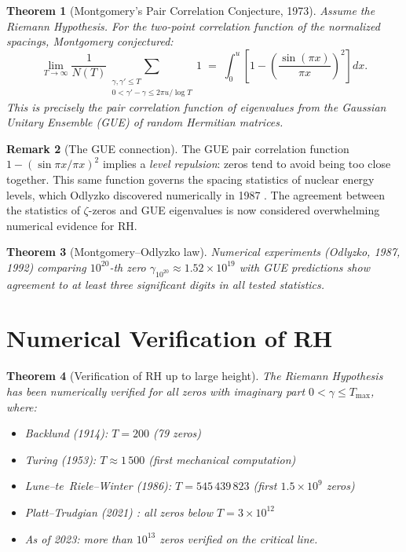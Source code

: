 \documentclass[12pt,a4paper]{amsart}
\newtheorem{theorem}{Theorem}[section]
\theoremstyle{definition}
\newtheorem{remark}[theorem]{Remark}
\begin{document}
\begin{theorem}[Montgomery's Pair Correlation Conjecture, 1973]
\label{thm:montgomery}
Assume the Riemann Hypothesis.  For the two-point correlation function
of the normalized spacings, Montgomery \cite{Montgomery1973} conjectured:
\[
  \lim_{T \to \infty} \frac{1}{N(T)} \sum_{\substack{\gamma, \gamma' \le T \\ 0 < \gamma'-\gamma \le 2\pi u / \log T}}
  1
  \;=\;
  \int_0^u \left[1 - \left(\frac{\sin(\pi x)}{\pi x}\right)^2\right] dx.
\]
This is precisely the pair correlation function of eigenvalues from the
\emph{Gaussian Unitary Ensemble} (GUE) of random Hermitian matrices.
\end{theorem}

\begin{remark}[The GUE connection]
The GUE pair correlation function $1 - (\sin\pi x / \pi x)^2$ implies
a \emph{level repulsion}: zeros tend to avoid being too close together.
This same function governs the spacing statistics of nuclear energy
levels, which Odlyzko discovered numerically in 1987 \cite{Odlyzko1987}.
The agreement between the statistics of $\zeta$-zeros and GUE eigenvalues
is now considered overwhelming numerical evidence for RH.
\end{remark}

\begin{theorem}[Montgomery--Odlyzko law]
\label{thm:odlyzko}
Numerical experiments (Odlyzko, 1987, 1992) comparing $10^{20}$-th zero
$\gamma_{10^{20}} \approx 1.52 \times 10^{19}$ with GUE predictions show
agreement to at least three significant digits in all tested statistics.
\end{theorem}

\section{Numerical Verification of RH}

\begin{theorem}[Verification of RH up to large height]
\label{thm:rh_verified}
The Riemann Hypothesis has been numerically verified for all zeros with
imaginary part $0 < \gamma \le T_{\max}$, where:
\begin{itemize}
  \item Backlund (1914): $T = 200$ (79 zeros)
  \item Turing (1953): $T \approx 1\,500$ (first mechanical computation)
  \item Lune--te~Riele--Winter (1986): $T = 545\,439\,823$ (first $1.5 \times 10^9$ zeros)
  \item Platt--Trudgian (2021) \cite{Platt2021}: all zeros below $T = 3 \times 10^{12}$
  \item As of 2023: more than $10^{13}$ zeros verified on the critical line.
\end{itemize}
\end{theorem}
\end{document}

